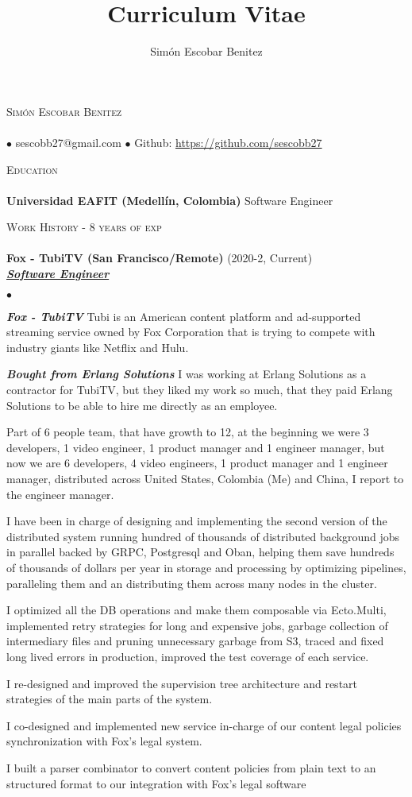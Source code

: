 \documentclass[a4paper]{article}
\title{Curriculum Vitae}
\author{Sim\'on Escobar Benitez}
\newcommand{\lineunder}{\vspace*{-8pt} \\ \hspace*{-18pt} \hrulefill \\}
\newcommand{\header}[1]{{\hspace*{-15pt}\vspace*{6pt}
  \textsc{#1}} \vspace*{-6pt} \lineunder}
\newcommand{\employer}[3]{{
  \textbf{#1} (#2)\\ \underline{\textbf{\emph{#3}}}\\ }}
\newcommand{\contact}[2]{
  \vspace*{-8pt}
  \begin{center}
  {\LARGE \scshape {#1}} \lineunder #2
  \end{center}
  \vspace*{-8pt} }
\newenvironment{achievements}{\begin{list}{$\bullet$}{\topsep 0pt \itemsep
  -2pt}}{\vspace*{4pt}\end{list}}
\newcommand{\schoolwithcourses}[2]{
  \textbf{#1} #2
  \vspace*{5pt} }
\newcommand{\emphasys}[1]{\textbf{\emph{#1}}}
\begin{document}
  \small
  \smallskip
  \vspace*{-44pt}
  \contact{Sim\'on Escobar Benitez} { $\bullet$ sescobb27@gmail.com $\bullet$ Github: \url{https://github.com/sescobb27} }
  \header{Education}
  \schoolwithcourses{Universidad EAFIT (Medell\'in, Colombia)}{Software Engineer}

  \header{Work History - 8 years of exp}

  \employer{ Fox - TubiTV (San Francisco/Remote)}{2020-2, Current}{Software Engineer}
  \begin{achievements}
  \item \emphasys{Fox - TubiTV} Tubi is an American content platform and ad-supported streaming service owned by Fox Corporation that is trying to compete with industry giants like Netflix and Hulu.
  \item \emphasys{Bought from Erlang Solutions} I was working at Erlang Solutions as a contractor for TubiTV, but they liked my work so much, that they paid Erlang Solutions to be able to hire me directly as an employee.
  \item Part of 6 people team, that have growth to 12, at the beginning we were 3 developers, 1 video engineer, 1 product manager and 1 engineer manager, but now we are 6 developers, 4 video engineers, 1 product manager and 1 engineer manager, distributed across United States, Colombia (Me) and China, I report to the engineer manager.
  \item I have been in charge of designing and implementing the second version of the distributed system running hundred of thousands of distributed background jobs in parallel backed by GRPC, Postgresql and Oban, helping them save hundreds of thousands of dollars per year in storage and processing by optimizing pipelines, paralleling them and an distributing them across many nodes in the cluster.
  \item I optimized all the DB operations and make them composable via Ecto.Multi, implemented retry strategies for long and expensive jobs, garbage collection of intermediary files and pruning unnecessary garbage from S3, traced and fixed long lived errors in production, improved the test coverage of each service.
  \item I re-designed and improved the supervision tree architecture and restart strategies of the main parts of the system.
  \item I co-designed and implemented new service in-charge of our content legal policies synchronization with Fox's legal system.
  \item I built a parser combinator to convert content policies from plain text to an structured format to our integration with Fox's legal software

\end{achievements}
\end{document}
